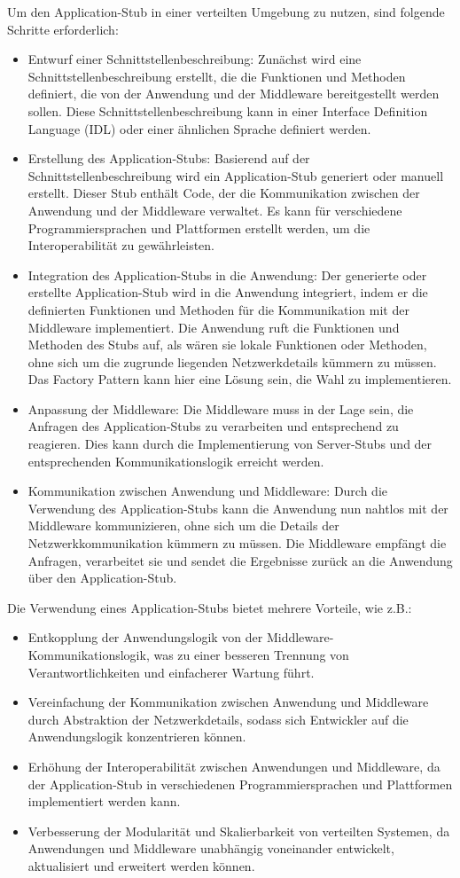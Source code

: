 Um den Application-Stub in einer verteilten Umgebung zu nutzen, sind folgende Schritte erforderlich:
\begin{itemize} 
\item Entwurf einer Schnittstellenbeschreibung: Zunächst wird eine Schnittstellenbeschreibung erstellt, die die Funktionen und Methoden definiert, die von der Anwendung und der Middleware bereitgestellt werden sollen. Diese Schnittstellenbeschreibung kann in einer Interface Definition Language (IDL) oder einer ähnlichen Sprache definiert werden.
\item Erstellung des Application-Stubs: Basierend auf der Schnittstellenbeschreibung wird ein Application-Stub generiert oder manuell erstellt. Dieser Stub enthält Code, der die Kommunikation zwischen der Anwendung und der Middleware verwaltet. Es kann für verschiedene Programmiersprachen und Plattformen erstellt werden, um die Interoperabilität zu gewährleisten.
\item Integration des Application-Stubs in die Anwendung: Der generierte oder erstellte Application-Stub wird in die Anwendung integriert, indem er die definierten Funktionen und Methoden für die Kommunikation mit der Middleware implementiert. Die Anwendung ruft die Funktionen und Methoden des Stubs auf, als wären sie lokale Funktionen oder Methoden, ohne sich um die zugrunde liegenden Netzwerkdetails kümmern zu müssen. Das Factory Pattern kann hier eine Lösung sein, die Wahl zu implementieren.
\item Anpassung der Middleware: Die Middleware muss in der Lage sein, die Anfragen des Application-Stubs zu verarbeiten und entsprechend zu reagieren. Dies kann durch die Implementierung von Server-Stubs und der entsprechenden Kommunikationslogik erreicht werden.
\item Kommunikation zwischen Anwendung und Middleware: Durch die Verwendung des Application-Stubs kann die Anwendung nun nahtlos mit der Middleware kommunizieren, ohne sich um die Details der Netzwerkkommunikation kümmern zu müssen. Die Middleware empfängt die Anfragen, verarbeitet sie und sendet die Ergebnisse zurück an die Anwendung über den Application-Stub.
\end{itemize} 
Die Verwendung eines Application-Stubs bietet mehrere Vorteile, wie z.B.:
\begin{itemize} 
\item Entkopplung der Anwendungslogik von der Middleware-Kommunikationslogik, was zu einer besseren Trennung von Verantwortlichkeiten und einfacherer Wartung führt.
\item Vereinfachung der Kommunikation zwischen Anwendung und Middleware durch Abstraktion der Netzwerkdetails, sodass sich Entwickler auf die Anwendungslogik konzentrieren können.
\item Erhöhung der Interoperabilität zwischen Anwendungen und Middleware, da der Application-Stub in verschiedenen Programmiersprachen und Plattformen implementiert werden kann.
\item Verbesserung der Modularität und Skalierbarkeit von verteilten Systemen, da Anwendungen und Middleware unabhängig voneinander entwickelt, aktualisiert und erweitert werden können.
\end{itemize} 

